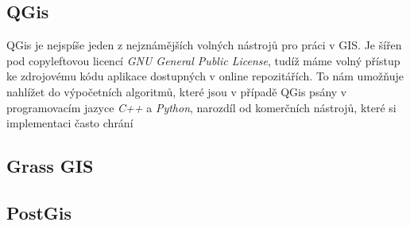 \subsection{QGis}
QGis je nejspíše jeden z nejznámějších volných nástrojů pro práci v GIS. Je šířen pod copyleftovou  licencí \textit{GNU General Public License}, tudíž máme volný přístup ke zdrojovému kódu aplikace dostupných v online repozitářích. To nám umožňuje nahlížet do výpočetních algoritmů, které jsou v případě QGis psány v programovacím jazyce \textit{C++} a \textit{Python}, narozdíl od komerčních nástrojů, které si implementaci často chrání

\subsection{Grass GIS}

\subsection{PostGis}
